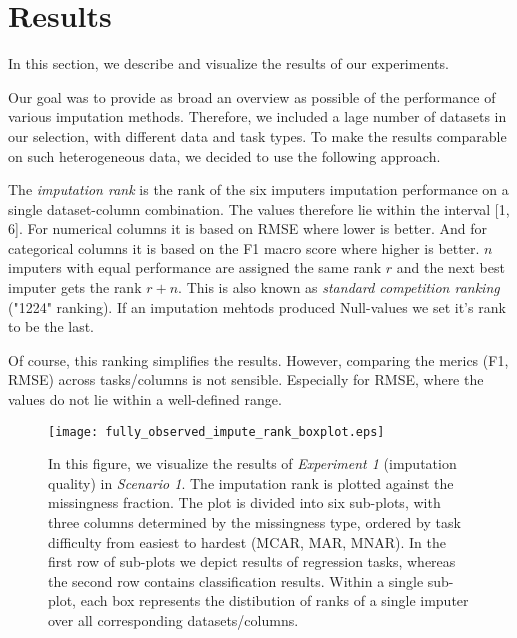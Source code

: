 \section{Results}
\label{sec:results}

In this section, we describe and visualize the results of our experiments.

Our goal was to provide as broad an overview as possible of the performance of various imputation methods. Therefore, we included a lage number of datasets in our selection, with different data and task types. To make the results comparable on such heterogeneous data, we decided to use the following approach.

The \textit{imputation rank} is the rank of the six imputers imputation performance on a single dataset-column combination. The values therefore lie within the interval [1, 6]. For numerical columns it is based on RMSE where lower is better. And for categorical columns it is based on the F1 macro score where higher is better. $n$ imputers with equal performance are assigned the same rank $r$ and the next best imputer gets the rank $r+n$. This is also known as \textit{standard competition ranking} ("1224" ranking). If an imputation mehtods produced Null-values we set it's rank to be the last.

Of course, this ranking simplifies the results. However, comparing the merics (F1, RMSE) across tasks/columns is not sensible. Especially for RMSE, where the values do not lie within a well-defined range.

\begin{figure}\centering
    \texttt{[image: fully\_observed\_impute\_rank\_boxplot.eps]}
    \caption[Scenario 1 Imputation Ranks]{In this figure, we visualize the results of \textit{Experiment 1} (imputation quality) in \textit{Scenario 1}. The imputation rank is plotted against the missingness fraction. The plot is divided into six sub-plots, with three columns determined by the missingness type, ordered by task difficulty from easiest to hardest (MCAR, MAR, MNAR). In the first row of sub-plots we depict results of regression tasks, whereas the second row contains classification results. Within a single sub-plot, each box represents the distibution of ranks of a single imputer over all corresponding datasets/columns.}\label{fig:fully_observed_impute_rank_boxplot}
\end{figure}


